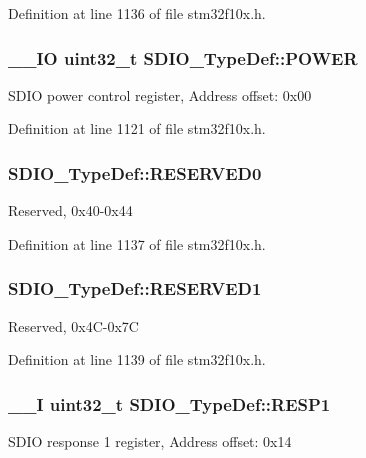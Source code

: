 Definition at line 1136 of file stm32f10x.\-h.

\hypertarget{struct_s_d_i_o___type_def_a7c156bc55f6d970a846a459d57a9e940}{
\subsubsection[{P\-O\-W\-E\-R}]{\setlength{\rightskip}{0pt plus 5cm}\-\_\-\-\_\-\-I\-O {\bf uint32\-\_\-t} S\-D\-I\-O\-\_\-\-Type\-Def\-::\-P\-O\-W\-E\-R}}\label{struct_s_d_i_o___type_def_a7c156bc55f6d970a846a459d57a9e940}
S\-D\-I\-O power control register, Address offset\-: 0x00 

Definition at line 1121 of file stm32f10x.\-h.

\hypertarget{struct_s_d_i_o___type_def_a0e2d457f1661d986074807447fcef6e5}{
\subsubsection[{R\-E\-S\-E\-R\-V\-E\-D0}]{ S\-D\-I\-O\-\_\-\-Type\-Def\-::\-R\-E\-S\-E\-R\-V\-E\-D0}}\label{struct_s_d_i_o___type_def_a0e2d457f1661d986074807447fcef6e5}
Reserved, 0x40-\/0x44 

Definition at line 1137 of file stm32f10x.\-h.

\hypertarget{struct_s_d_i_o___type_def_ae2d37baf85fa8126193bf7efc5d63d7a}{
\subsubsection[{R\-E\-S\-E\-R\-V\-E\-D1}]{ S\-D\-I\-O\-\_\-\-Type\-Def\-::\-R\-E\-S\-E\-R\-V\-E\-D1}}\label{struct_s_d_i_o___type_def_ae2d37baf85fa8126193bf7efc5d63d7a}
Reserved, 0x4\-C-\/0x7\-C 

Definition at line 1139 of file stm32f10x.\-h.

\hypertarget{struct_s_d_i_o___type_def_a2b6f1ca5a5a50f8ef5417fe7be22553c}{
\subsubsection[{R\-E\-S\-P1}]{\setlength{\rightskip}{0pt plus 5cm}\-\_\-\-\_\-\-I {\bf uint32\-\_\-t} S\-D\-I\-O\-\_\-\-Type\-Def\-::\-R\-E\-S\-P1}}\label{struct_s_d_i_o___type_def_a2b6f1ca5a5a50f8ef5417fe7be22553c}
S\-D\-I\-O response 1 register, Address offset\-: 0x14 

